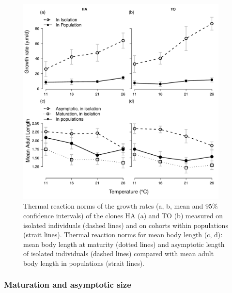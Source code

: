 \begin{figure}[!ht] %
\centering
\includegraphics[width=0.95\textwidth]{5_ChapExp3/fig/Fig3} 
\caption[Thermal reaction norms of the growth
rates]{ Thermal reaction norms of the growth rates (a, b, mean and 95\% confidence intervals) of the clones HA (a) and TO (b) measured on isolated individuals (dashed lines)
and on cohorts within populations (strait lines). Thermal reaction norms for
mean body length (c, d): mean body length at maturity (dotted lines) and
asymptotic length of isolated individuals (dashed lines) compared with mean
adult body length in populations (strait lines).}
\label{Fig5-3}
\end{figure}

\subsubsection{Maturation and asymptotic size}

